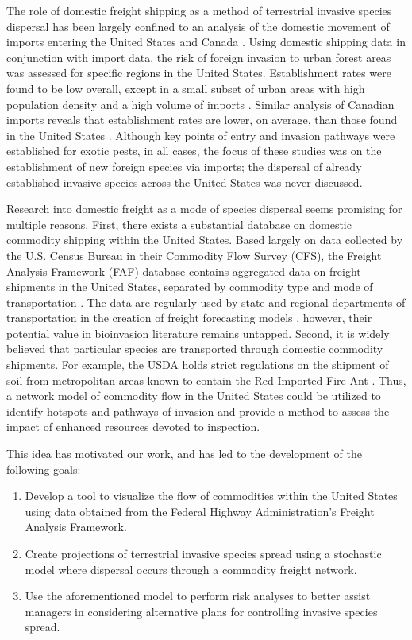 \documentclass[12pt]{article}
\begin{document}
The role of domestic freight shipping as a method of terrestrial invasive species dispersal has been largely confined to an analysis of the domestic movement of imports entering the United States and Canada \citep{Koch2011, Colunga2009, Yemshanov2013}.  Using domestic shipping data in conjunction with import data, the risk of foreign invasion to urban forest areas was assessed for specific regions in the United States.  Establishment rates were found to be low overall, except in a small subset of urban areas with high population density and a high volume of imports \citep{Colunga2009, Koch2011}.  Similar analysis of Canadian imports reveals that establishment rates are lower, on average, than those found in the United States \citep{Yemshanov2013}.  Although key points of entry and invasion pathways were established for exotic pests, in all cases, the focus of these studies was on the establishment of new foreign species via imports; the dispersal of already established invasive species across the United States was never discussed.  

Research into domestic freight as a mode of species dispersal seems promising for multiple reasons.  First, there exists a substantial database on domestic commodity shipping within the United States.  Based largely on data collected by the U.S. Census Bureau in their Commodity Flow Survey (CFS), the Freight Analysis Framework (FAF) database contains aggregated data on freight shipments in the United States, separated by commodity type and mode of transportation \citep{FAF3manual, FAFwebsite}.  The data are regularly used by state and regional departments of transportation in the creation of freight forecasting models \citep{NCHRP, Chow2010, Sivakumar2002}, however, their potential value in bioinvasion literature remains untapped.  Second, it is widely believed that particular species are transported through domestic commodity shipments. For example, the USDA holds strict regulations on the shipment of soil from metropolitan areas known to contain the Red Imported Fire Ant \citep{USDA}.  Thus, a network model of commodity flow in the United States could be utilized to identify hotspots and pathways of invasion and provide a method to assess the impact of enhanced resources devoted to inspection. 

This idea has motivated our work, and has led to the development of the following goals:

\begin{enumerate}

\item Develop a tool to visualize the flow of commodities within the United States using data obtained from the Federal Highway Administration's Freight Analysis Framework.

\item Create projections of terrestrial invasive species spread using a stochastic model where dispersal occurs through a commodity freight network.

\item Use the aforementioned model to perform risk analyses to better assist managers in considering alternative plans for controlling invasive species spread.

\end{enumerate}
\end{document}
